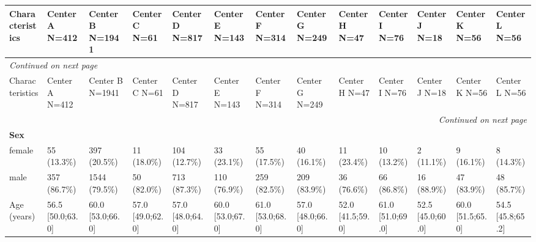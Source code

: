 \documentclass{article}
\begin{document}
\addtocounter{table}{-1}
\begin{landscape}
  \label{tab:external_multicenter_baseline_filtered}
\begin{tiny}
\setlength{\tabcolsep}{3pt}
\renewcommand{\arraystretch}{1.12}
\begin{tabularx}{\linewidth}{p{4.5cm}|X|X|X|X|X|X|X|X|X|X|X|X}
\toprule
Characteristics & Center A      N=412       & Center B      N=1941      & Center C       N=61       & Center D      N=817       & Center E      N=143       & Center F      N=314       & Center G      N=249       & Center H       N=47       & Center I       N=76       & Center J       N=18       & Center K       N=56       & Center L       N=56       \\ \midrule
\midrule
\endfirsthead
\multicolumn{13}{l}{\small\emph{Continued on next page}} \\
\toprule
Characteristics & Center A      N=412       & Center B      N=1941      & Center C       N=61       & Center D      N=817       & Center E      N=143       & Center F      N=314       & Center G      N=249       & Center H       N=47       & Center I       N=76       & Center J       N=18       & Center K       N=56       & Center L       N=56       \\ \midrule
\midrule
\endhead
\midrule \multicolumn{13}{r}{\small\emph{Continued on next page}} \\
\endfoot
\bottomrule
\endlastfoot
\rowcolor{gray!30}
\textbf{Sex }  &  &  &  &  &  &  &  &  &  &  &  &  \\
\rowcolor{gray!10}
    female &    55 (13.3\%)    &   397 (20.5\%)    &    11 (18.0\%)    &   104 (12.7\%)    &    33 (23.1\%)    &    55 (17.5\%)    &    40 (16.1\%)    &    11 (23.4\%)    &    10 (13.2\%)    &    2 (11.1\%)     &    9 (16.1\%)     &    8 (14.3\%)     \\
\rowcolor{gray!10}
    male &   357 (86.7\%)    &   1544 (79.5\%)   &    50 (82.0\%)    &   713 (87.3\%)    &   110 (76.9\%)    &   259 (82.5\%)    &   209 (83.9\%)    &    36 (76.6\%)    &    66 (86.8\%)    &    16 (88.9\%)    &    47 (83.9\%)    &    48 (85.7\%)    \\
\rowcolor{gray!10}
Age (years) & 56.5 [50.0;63.0] & 60.0 [53.0;66.0] & 57.0 [49.0;62.0] & 57.0 [48.0;64.0] & 60.0 [53.0;67.0] & 61.0 [53.0;68.0] & 57.0 [48.0;66.0] & 52.0 [41.5;59.0] & 61.0 [51.0;69.0] & 52.5 [45.0;60.0] & 60.0 [51.5;65.0] & 54.5 [45.8;65.2] \\

\end{tabularx}
\end{tiny}
\end{landscape}
\end{document}
